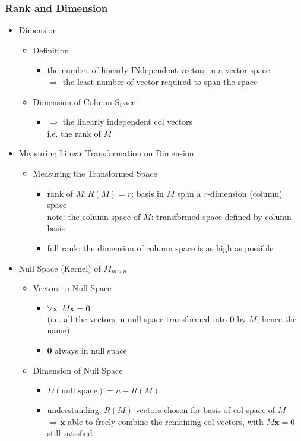 \subsubsection{Rank and Dimension}
\begin{itemize}
\item Dimension
	\begin{itemize}
	\item Definition
		\begin{itemize}
		\item the number of linearly INdependent vectors in a vector space \\
		$\Rightarrow$ the least number of vector required to span the space
		\end{itemize}
	\item Dimension of Column Space
		\begin{itemize}
		\item $\Rightarrow$ the linearly independent col vectors \\
		i.e. the rank of $M$
		\end{itemize}
	\end{itemize}

\item Measuring Linear Transformation on Dimension
	\begin{itemize}
	\item Measuring the Transformed Space
		\begin{itemize}
		\item rank of $M: R(M)=r$: basis in $M$ span a $r$-dimension (column) space \\
		note: the column space of $M$: transformed space defined by column basis
		\item full rank: the dimension of column space is as high as possible
		\end{itemize}
	\end{itemize}
	
\item Null Space (Kernel) of $M_{m\times n}$
	\begin{itemize}
	\item Vectors in Null Space
		\begin{itemize}
		\item $\forall \mathbf x, M\mathbf x = \mathbf 0$ \\
		(i.e. all the vectors in null space transformed into $\mathbf 0$ by $M$, hence the name)
		\item $\mathbf 0$ always in null space
		\end{itemize}
	\item Dimension of Null Space
		\begin{itemize}
		\item $D(\text{null space}) = n - R(M)$ \\
		\item understanding: $R(M)$ vectors chosen for basis of col space of $M$ \\ 
		$\Rightarrow \mathbf x$ able to freely combine the remaining col vectors, with $M\mathbf x=0$ still satisfied
		\end{itemize}
	\end{itemize}
	

\end{itemize}

